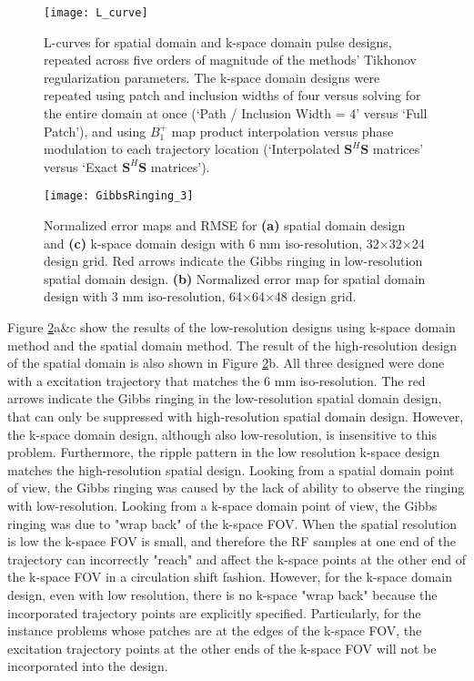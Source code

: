 \begin{figure}
	\centering
	\texttt{[image: L\_curve]}
	\caption{L-curves for spatial domain and k-space domain pulse designs, 
	repeated across five orders of magnitude of the methods' Tikhonov regularization parameters.
	The k-space domain designs were repeated using patch and inclusion widths of four versus solving for the entire domain at once (`Path / Inclusion Width = 4' versus `Full Patch'),
	and using $B_1^+$ map product interpolation versus phase modulation to each trajectory location (`Interpolated $\bm{S}^H\bm{S}$ matrices' versus
	`Exact $\bm{S}^H\bm{S}$ matrices').}
	\label{fig:LCurves}
\end{figure}



\begin{figure}
	\centering
	\texttt{[image: GibbsRinging\_3]}
	\caption{Normalized error maps and RMSE for \textbf{(a)} spatial domain design and \textbf{(c)} k-space domain design with 6 mm iso-resolution, 32$\times$32$\times$24 design grid. Red arrows indicate the Gibbs ringing in low-resolution spatial domain design. \textbf{(b)} Normalized error map for spatial domain design with 3 mm iso-resolution, 64$\times$64$\times$48 design grid.}
	\label{fig:GibbsRing}
\end{figure}

Figure \ref{fig:GibbsRing}a\&c show the results of the  low-resolution designs using k-space domain method and the spatial domain method. The result of the high-resolution design of the spatial domain is also shown in Figure \ref{fig:GibbsRing}b. All three designed were done with a excitation trajectory that matches the 6 mm iso-resolution. The red arrows indicate the Gibbs ringing in the low-resolution spatial domain design, that can only be suppressed with high-resolution spatial domain design. However, the k-space domain design, although also low-resolution, is insensitive to this problem. Furthermore, the ripple pattern in the low resolution k-space design matches the high-resolution spatial design. Looking from a spatial domain point of view, the Gibbs ringing was caused by the lack of ability to observe the ringing with low-resolution. Looking from a k-space domain point of view, the Gibbs ringing was due to "wrap back" of the k-space FOV. When the spatial resolution is low the k-space FOV is small, and therefore the RF samples at one end of the trajectory can incorrectly "reach" and affect the k-space points at the other end of the k-space FOV in a circulation shift fashion. However, for the k-space domain design, even with low resolution, there is no k-space "wrap back" because the incorporated trajectory points are explicitly specified. Particularly, for the instance problems whose patches are at the edges of the k-space FOV, the excitation trajectory points at the other ends of the k-space FOV will not be incorporated into the design.    


